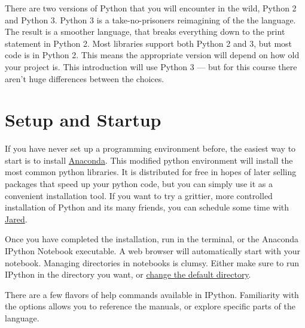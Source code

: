 \documentclass[justified, nobib]{tufte-handout}
\makeatletter
\newcommand{\anacondaLink}{https://store.continuum.io/cshop/anaconda/}
\newcommand{\email}{mailto:jgarst@ucdavis.edu}
\newcommand{\customizeDirectoryLink}
  {http://stackoverflow.com/questions/15680463/change-ipython-working-directory}
\makeatother
\begin{document}
\smallskip
\noindent
There are two versions of Python that you will encounter in the wild, Python 2 and Python 3.
Python 3 is a take-no-prisoners reimagining of the the language.
The result is a smoother language, that breaks everything down to the print statement in Python 2.
Most libraries support both Python 2 and 3, but most code is in Python 2.
This means the appropriate version will depend on how old your project is.
This introduction will use Python 3 --- but for this course there aren't huge differences between the choices.

\section*{Setup and Startup}
If you have never set up a programming environment before, the easiest way to start is to install \href{\anacondaLink}{Anaconda}.
This modified python environment will install the most common python libraries.
It is distributed for free in hopes of later selling packages that speed up your python code, but you can simply use it as a convenient installation tool.
If you want to try a grittier, more controlled installation of Python and its many friends, you can schedule some time with \href{\email}{Jared}.

\smallskip
\noindent
Once you have completed the installation, run  in the terminal, or the Anaconda IPython Notebook executable.
A web browser will automatically start with your notebook.
Managing directories in notebooks is clumsy.
Either make sure to run IPython in the directory you want, or \href{\customizeDirectoryLink}{change the default directory}.

\smallskip
\noindent
There are a few flavors of help commands available in IPython.
Familiarity with the options allows you to reference the manuals, or explore specific parts of the language.

\end{document}
